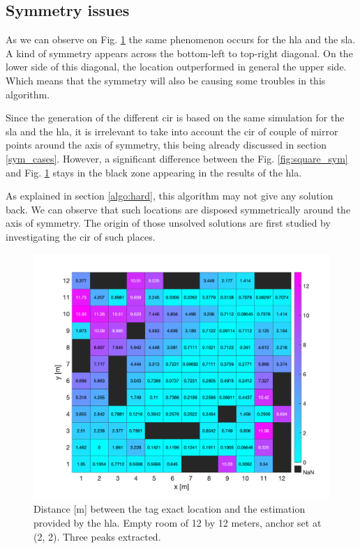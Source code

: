 \subsection{Symmetry issues}

As we can observe on Fig. \ref{fig:sym_hard} the same phenomenon occurs for the \gls{hla} and the \gls{sla}. A kind of symmetry appears across the bottom-left to top-right diagonal. On the lower side of this diagonal, the location outperformed in general the upper side. Which means that the symmetry will also be causing some troubles in this algorithm.
\vspace{2mm}

Since the generation of the different \gls{cir} is based on the same simulation for the \gls{sla} and the \gls{hla}, it is irrelevant to take into account the \gls{cir} of couple of mirror points around the axis of symmetry, this being already discussed in section \ref{sym_cases}. However, a significant difference between the Fig. \ref{fig:square_sym} and Fig. \ref{fig:sym_hard} stays in the black zone appearing in the results of the \gls{hla}.
\vspace{2mm}

As explained in section \ref{algo:hard}, this algorithm may not give any solution back. We can observe that such locations are disposed symmetrically around the axis of symmetry. The origin of those unsolved solutions are first studied by investigating the \gls{cir} of such places. 

\begin{figure}[H]
\centering
\includegraphics[width=.8\linewidth]{Images/hla_images/hla_anchor_(2_2)_empty.png}
\caption{Distance [m] between the tag exact location and the estimation provided by the \gls{hla}. Empty room of 12 by 12 meters, anchor set at (2, 2). Three peaks extracted. \label{fig:sym_hard}}
\end{figure}

